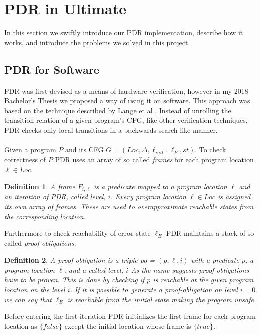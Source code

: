 \documentclass{article}
\newtheorem{mydef}{Definition}
\begin{document}
	\pagebreak
	
	\section{PDR in Ultimate}
	In this section we swiftly introduce our PDR implementation, describe how it works, and introduce the problems we solved in this project.
	
	\subsection{PDR for Software}
	PDR was first devised as a means of hardware verification, however in my 2018 Bachelor's Thesis we proposed a way of using it on software. This approach was based on the technique described by Lange et al \cite{DBLP:conf/fmcad/0001NN15}.
	Instead of unrolling the transition relation of a given program's CFG, like other verification techniques, PDR checks only local transitions in a backwards-search like manner. \\ \\
	Given a program $P$ and its CFG  $G = (Loc, \Delta, \ell_{init}, \ell_E, st)$. To check correctness of $P$ PDR uses an array of so called \textsl{frames} for each program location $\ell \in Loc$. 
	\begin{mydef}
		A frame $F_{i,\ell}$ is a predicate mapped to a program location $\ell$ and an iteration of PDR, called level, $i$.
		Every program location $\ell \in Loc$ is assigned its own array of frames. These are used to overapproximate reachable states from the corresponding location.
	\end{mydef}
	Furthermore to check reachability of error state $\ell_E$ PDR maintains a stack of so called \textsl{proof-obligations}.
	\begin{mydef}
		A proof-obligation is a triple po = $(p, \ell, i)$ with a predicate $p$, a program location $\ell$, and a called level, $i$
		As the name suggests proof-obligations have to be proven. This is done by checking if $p$ is reachable at the given program location on the level $i$. If it is possible to generate a proof-obligation on level $i = 0$ we can say that $\ell_E$ is reachable from the initial state making the program unsafe.
	\end{mydef}

	Before entering the first iteration PDR initializes the first frame for each program location as $\{ false \}$ except the initial location whose frame is $\{ true \}$. \\ \\
	
\end{document}
